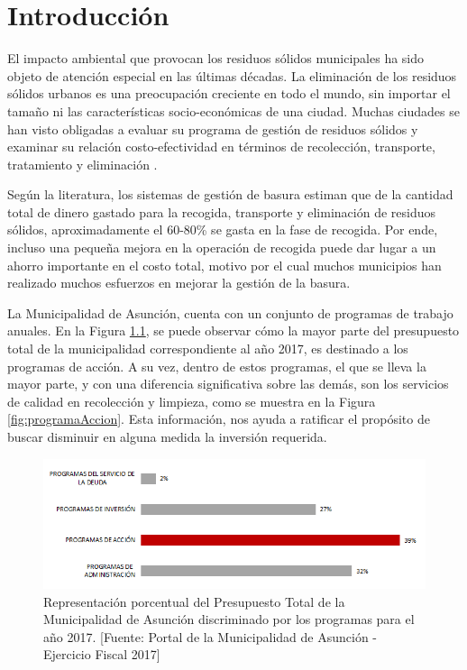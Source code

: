 \chapter{Introducción}
\label{chap1}
\ifpdf
  \graphicspath{{Chapter1/Chapter1Figs/PNG/}{Chapter1/Chapter1Figs/PDF/}{Chapter1/Chapter1Figs/}}
\else
  \graphicspath{{Chapter1/Chapter1Figs/EPS/}{Chapter1/Chapter1Figs/}}
\fi


El impacto ambiental que provocan los residuos sólidos municipales ha sido objeto de atención especial en las últimas décadas. La eliminación de los residuos sólidos urbanos es una preocupación creciente en todo el mundo, sin importar el tamaño ni las características socio-económicas de una ciudad. Muchas ciudades se han visto obligadas a evaluar su programa de gestión de residuos sólidos y examinar su relación costo-efectividad en términos de recolección, transporte, tratamiento y eliminación \citep{Karadimas2007OptimalAlgorithm}.

Según la literatura, los sistemas de gestión de basura estiman que de la cantidad total de dinero gastado para la recogida, transporte y eliminación de residuos sólidos, aproximadamente el 60-80\% se gasta en la fase de recogida. Por ende, incluso una pequeña mejora en la operación de recogida puede dar lugar a un ahorro importante en el costo total, motivo por el cual muchos municipios han realizado muchos esfuerzos en mejorar la gestión de la basura.

La Municipalidad de Asunción, cuenta con un conjunto de programas de trabajo anuales. En la Figura \ref{fig:porcentajePresupuesto}, se puede observar cómo la mayor parte del presupuesto total de la municipalidad correspondiente al año 2017, es destinado a los programas de acción. A su vez, dentro de estos programas, el que se lleva la mayor parte, y con una diferencia significativa sobre las demás, son los servicios de calidad en recolección y limpieza, como se muestra en la Figura \ref{fig:programaAccion}. Esta información, nos ayuda a ratificar el propósito de buscar disminuir en alguna medida la inversión requerida.

\begin{figure}[H]
    \centering
    \includegraphics[width=14.5cm]{20181119_PresupuestoTotal2017.png}
    \caption{Representación porcentual del Presupuesto Total de la Municipalidad de Asunción discriminado por los programas para el año 2017. [Fuente: Portal de la Municipalidad de Asunción - Ejercicio Fiscal 2017]}
    \label{fig:porcentajePresupuesto}
\end{figure}

